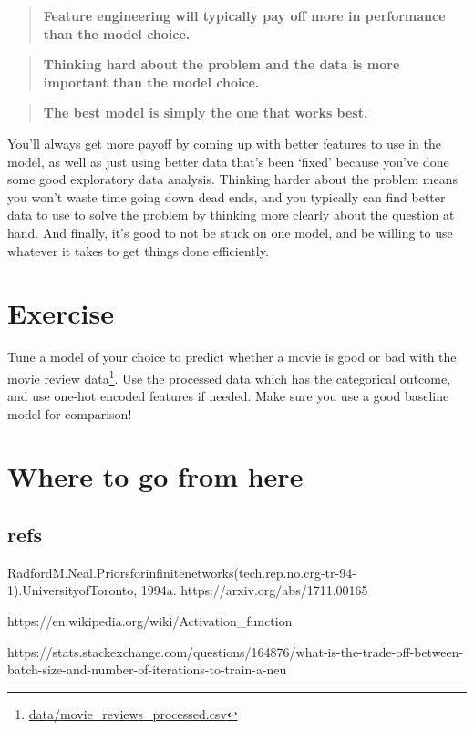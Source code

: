 \documentclass[
  letterpaper,
]{krantz}
\DeclareRobustCommand{\href}[2]{#2\footnote{\url{#1}}}
\begin{document}
\begin{quote}
\textbf{Feature engineering will typically pay off more in performance
than the model choice.}
\end{quote}

\begin{quote}
\textbf{Thinking hard about the problem and the data is more important
than the model choice.}
\end{quote}

\begin{quote}
\textbf{The best model is simply the one that works best.}
\end{quote}

You'll always get more payoff by coming up with better features to use
in the model, as well as just using better data that's been `fixed'
because you've done some good exploratory data analysis. Thinking harder
about the problem means you won't waste time going down dead ends, and
you typically can find better data to use to solve the problem by
thinking more clearly about the question at hand. And finally, it's good
to not be stuck on one model, and be willing to use whatever it takes to
get things done efficiently.

\section{Exercise}\label{exercise}

Tune a model of your choice to predict whether a movie is good or bad
with the \href{data/movie_reviews_processed.csv}{movie review data}. Use
the processed data which has the categorical outcome, and use one-hot
encoded features if needed. Make sure you use a good baseline model for
comparison!

\section{Where to go from here}\label{where-to-go-from-here-1}

\subsection{refs}\label{refs-2}

RadfordM.Neal.Priorsforinfinitenetworks(tech.rep.no.crg-tr-94-1).UniversityofToronto,
1994a. https://arxiv.org/abs/1711.00165

https://en.wikipedia.org/wiki/Activation\_function

https://stats.stackexchange.com/questions/164876/what-is-the-trade-off-between-batch-size-and-number-of-iterations-to-train-a-neu
\end{document}
